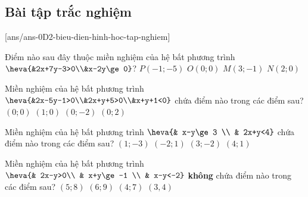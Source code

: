 \subsection{Bài tập trắc nghiệm}
[ans/ans-0D2-bieu-dien-hinh-hoc-tap-nghiem]
\begin{ex}%
	Điểm nào sau đây thuộc miền nghiệm của hệ bất phương trình $\heva{&2x+7y-3>0\\&x-2y\ge 0}$?
	\choice
	{$P(-1;-5)$}
	{$O(0;0)$}
	{$M(3;-1)$}
	{\True $N(2;0)$}
\end{ex}
\begin{ex}%
	Miền nghiệm của hệ bất phương trình $\heva{&2x-5y-1>0\\&2x+y+5>0\\&x+y+1<0}$ chứa điểm nào trong các điểm sau?
	\choice
	{$(0;0)$}
	{$(1;0)$}
	{\True $(0;-2)$}
	{$(0;2)$}
\end{ex}

\begin{ex}%
	Miền nghiệm của hệ bất phương trình $\heva{& x-y\ge 3 \\ & 2x+y<4}$ chứa điểm nào trong các điểm sau?
	\choice
	{\True $(1;-3)$}
	{$(-2;1)$}
	{$(3;-2)$}
	{$(4;1)$}
\end{ex}

\begin{ex}%
	Miền nghiệm của hệ bất phương trình $\heva{& 2x-y>0\\ & x+y\ge -1 \\ & x-y<-2}$ \textbf{không} chứa điểm nào trong các điểm sau?
	\choice
	{$(5;8)$}
	{$(6;9)$}
	{$(4;7)$}
	{\True $(3,4)$}
\end{ex}

